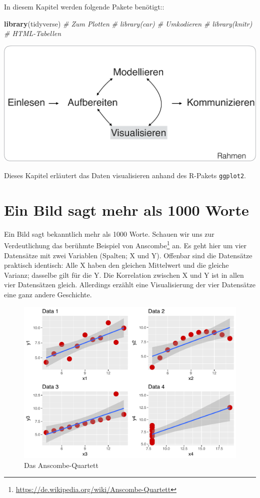 \documentclass[12pt,ngerman,]{book}
\newenvironment{Shaded}{\begin{snugshade}}{\end{snugshade}}
\newcommand{\KeywordTok}[1]{\textcolor[rgb]{0.13,0.29,0.53}{\textbf{{#1}}}}
\newcommand{\CommentTok}[1]{\textcolor[rgb]{0.56,0.35,0.01}{\textit{{#1}}}}
\newcommand{\NormalTok}[1]{{#1}}
\let\rmarkdownfootnote\footnote%
\def\footnote{\protect\rmarkdownfootnote}
\renewenvironment{Shaded}{\begin{kframe}}{\end{kframe}}
\begin{document}
In diesem Kapitel werden folgende Pakete benötigt::

\begin{Shaded}
\begin{Highlighting}[]
\KeywordTok{library}\NormalTok{(tidyverse)  }\CommentTok{# Zum Plotten}
\CommentTok{# library(car)  # Umkodieren}
\CommentTok{# library(knitr)  # HTML-Tabellen}
\end{Highlighting}
\end{Shaded}

\begin{center}\includegraphics[width=0.7\linewidth]{images/visualisieren/Visualisieren} \end{center}

Dieses Kapitel erläutert das Daten visualisieren anhand des R-Pakets
\texttt{ggplot2}.

\section{Ein Bild sagt mehr als 1000
Worte}\label{ein-bild-sagt-mehr-als-1000-worte}

Ein Bild sagt bekanntlich mehr als 1000 Worte. Schauen wir uns zur
Verdeutlichung das berühmte Beispiel von Anscombe\footnote{\url{https://de.wikipedia.org/wiki/Anscombe-Quartett}}
an. Es geht hier um vier Datensätze mit zwei Variablen (Spalten; X und
Y). Offenbar sind die Datensätze praktisch identisch: Alle X haben den
gleichen Mittelwert und die gleiche Varianz; dasselbe gilt für die Y.
Die Korrelation zwischen X und Y ist in allen vier Datensätzen gleich.
Allerdings erzählt eine Visualisierung der vier Datensätze eine ganz
andere Geschichte.

\begin{figure}

{\centering \includegraphics[width=0.7\linewidth]{images/visualisieren/anscombe} 

}

\caption{Das Anscombe-Quartett}\label{fig:fig-anscombe}
\end{figure}
\end{document}
